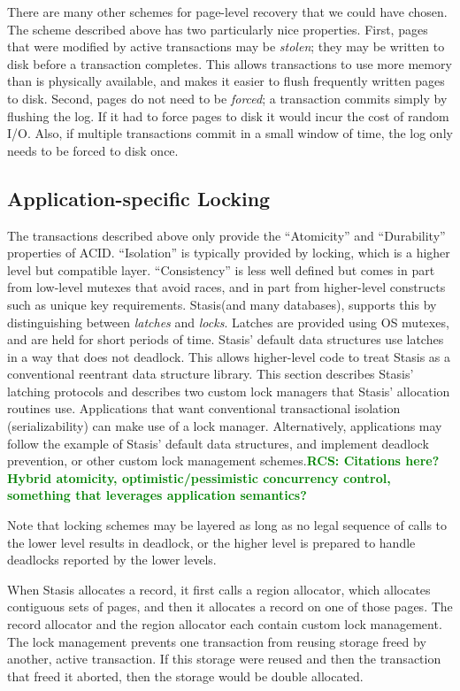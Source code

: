 \documentclass[letterpaper,twocolumn,10pt]{article}
\newcommand{\yad}{Stasis\xspace}
\newcommand{\yads}{Stasis'\xspace}
\newcommand{\rcs}[1]{\textcolor{green}{\bf RCS: #1}}
\begin{document}
{There are many other schemes for page-level recovery that we could
have chosen.  The scheme described above has two particularly nice
properties.  First, pages that were modified by active transactions
may be {\em stolen}; they may be written to disk before a transaction
completes.  This allows transactions to use more memory than is
physically available, and makes it easier to flush frequently written
pages to disk.  Second, pages do not need to be {\em forced}; a
transaction commits simply by flushing the log.  If it had to force
pages to disk it would incur the cost of random I/O.  Also, if
multiple transactions commit in a small window of time, the log only
needs to be forced to disk once.
}




\subsection{Application-specific Locking}
\label{sec:locking}
The transactions described above only provide the
``Atomicity'' and ``Durability'' properties of ACID.
  ``Isolation'' is
typically provided by locking, which is a higher level but
compatible layer.  ``Consistency'' is less well defined but comes in
part from low-level mutexes that avoid races, and in part from
higher-level constructs such as unique key requirements.  \yad (and many databases),
supports this by distinguishing between {\em latches} and {\em locks}.
Latches are provided using OS mutexes, and are held for
short periods of time.  \yads default data structures use latches in a
way that does not deadlock.  This allows higher-level code to treat 
\yad as a conventional reentrant data structure library.  
This section describes \yads latching protocols and describes two custom lock
managers that \yads allocation routines use.  Applications that want
conventional transactional isolation (serializability) can make 
use of a lock manager.  Alternatively, applications may follow 
the example of \yads default data structures, and implement 
deadlock prevention, or other custom lock management schemes.\rcs{Citations here? Hybrid atomicity, optimistic/pessimistic concurrency control, something that leverages application semantics?}

Note that locking schemes may be
layered as long as no legal sequence of calls to the lower level
results in deadlock, or the higher level is prepared to handle
deadlocks reported by the lower levels.

When \yad allocates a
record, it first calls a region allocator, which allocates contiguous
sets of pages, and then it allocates a record on one of those pages.
The record allocator and the region allocator each contain custom lock
management.  The lock management prevents one transaction from reusing 
storage freed by another, active transaction.  If this storage were 
reused and then the transaction that freed it aborted, then the 
storage would be double allocated.
\end{document}
